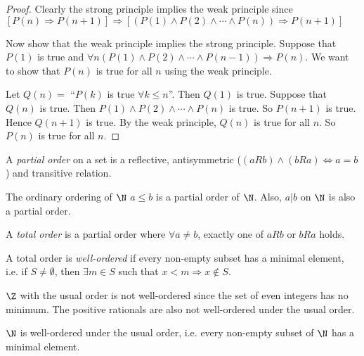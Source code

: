 \documentclass[a4paper]{article}
\begin{document}
  \begin{proof}
    Clearly the strong principle implies the weak principle since $[P(n)\Rightarrow P(n + 1)] \Rightarrow [(P(1)\wedge P(2)\wedge \cdots \wedge P(n))\Rightarrow P(n + 1)]$

    Now show that the weak principle implies the strong principle. Suppose that $P(1)$ is true and $\forall n(P(1)\wedge P(2)\wedge \cdots \wedge P(n - 1))\Rightarrow P(n)$. We want to show that $P(n)$ is true for all $n$ using the weak principle.

    Let $Q(n) = $ ``$P(k)$ is true $\forall k\leq n$''. Then $Q(1)$ is true. Suppose that $Q(n)$ is true. Then $P(1)\wedge P(2)\wedge\cdots \wedge P(n)$ is true. So $P(n+1)$ is true. Hence $Q(n + 1)$ is true. By the weak principle, $Q(n)$ is true for all $n$. So $P(n)$ is true for all $n$.
  \end{proof}

  \begin{defi}
    A \emph{partial order} on a set is a reflective, antisymmetric ($(aRb) \wedge (bRa) \Leftrightarrow a = b$) and transitive relation. 
  \end{defi}

  \begin{eg}
    The ordinary ordering of $\N$ $a\leq b$ is a partial order of $\N$. Also, $a|b$ on $\N$ is also a partial order.
  \end{eg}

  \begin{defi}
    A \emph{total order} is a partial order where $\forall a\not= b$, exactly one of $aRb$ or $bRa$ holds.
  \end{defi}

  \begin{defi}
    A total order is \emph{well-ordered} if every non-empty subset has a minimal element, i.e. if $S\not= \emptyset$, then $\exists m\in S$ such that $x < m \Rightarrow x\not\in S$.
  \end{defi}

  \begin{eg}
    $\Z$ with the usual order is not well-ordered since the set of even integers has no minimum. The positive rationals are also not well-ordered under the usual order.
  \end{eg}

  \begin{thm}
    $\N$ is well-ordered under the usual order, i.e. every non-empty subset of $\N$ has a minimal element.
  \end{thm}
\end{document}
